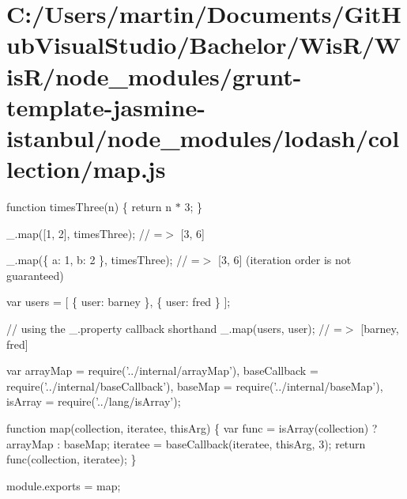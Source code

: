 \hypertarget{_c_1_2_users_2martin_2_documents_2_git_hub_visual_studio_2_bachelor_2_wis_r_2_wis_r_2node_moduled8aa02644561551e8cdd286f229f0b7a}{}\section{C\+:/\+Users/martin/\+Documents/\+Git\+Hub\+Visual\+Studio/\+Bachelor/\+Wis\+R/\+Wis\+R/node\+\_\+modules/grunt-\/template-\/jasmine-\/istanbul/node\+\_\+modules/lodash/collection/map.\+js}
function times\+Three(n) \{ return n $\ast$ 3; \}

\+\_\+.\+map(\mbox{[}1, 2\mbox{]}, times\+Three); // =$>$ \mbox{[}3, 6\mbox{]}

\+\_\+.\+map(\{ \textquotesingle{}a\textquotesingle{}\+: 1, \textquotesingle{}b\textquotesingle{}\+: 2 \}, times\+Three); // =$>$ \mbox{[}3, 6\mbox{]} (iteration order is not guaranteed)

var users = \mbox{[} \{ \textquotesingle{}user\textquotesingle{}\+: \textquotesingle{}barney\textquotesingle{} \}, \{ \textquotesingle{}user\textquotesingle{}\+: \textquotesingle{}fred\textquotesingle{} \} \mbox{]};

// using the {\ttfamily \+\_\+.\+property} callback shorthand \+\_\+.\+map(users, \textquotesingle{}user\textquotesingle{}); // =$>$ \mbox{[}\textquotesingle{}barney\textquotesingle{}, \textquotesingle{}fred\textquotesingle{}\mbox{]}


\begin{DoxyCodeInclude}
var arrayMap = require(\textcolor{stringliteral}{'../internal/arrayMap'}),
    baseCallback = require(\textcolor{stringliteral}{'../internal/baseCallback'}),
    baseMap = require(\textcolor{stringliteral}{'../internal/baseMap'}),
    isArray = require(\textcolor{stringliteral}{'../lang/isArray'});

\textcolor{keyword}{function} map(collection, iteratee, thisArg) \{
  var func = isArray(collection) ? arrayMap : baseMap;
  iteratee = baseCallback(iteratee, thisArg, 3);
  \textcolor{keywordflow}{return} func(collection, iteratee);
\}

module.exports = map;
\end{DoxyCodeInclude}
 